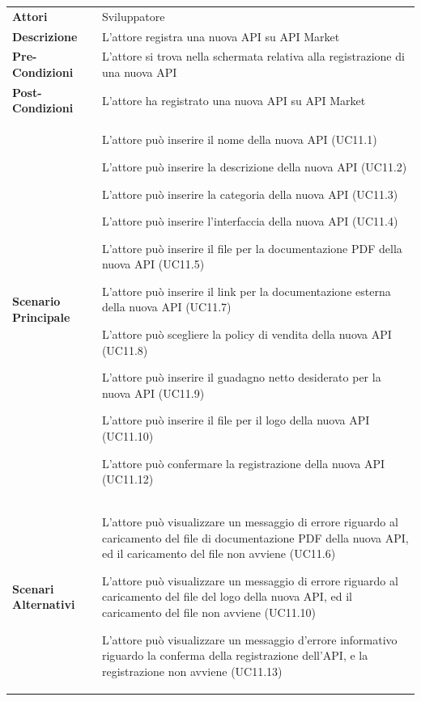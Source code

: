 \begin{longtable}{ l | p{11cm}}
	\hline
	\rowcolor{Gray}
	\multicolumn{2}{c}{UC11 - Registrazione nuova API}\\
	\hline
	\textbf{Attori} & Sviluppatore \\
	\textbf{Descrizione} & L'attore registra una nuova API su API Market \\
	\textbf{Pre-Condizioni} & L'attore si trova nella schermata relativa alla registrazione di una nuova API \\
	\textbf{Post-Condizioni} & L'attore ha registrato una nuova API su API Market \\
	\textbf{Scenario Principale} & 
	\begin{enumerate*}[label=(\arabic*.),itemjoin={\newline}]
		\item L'attore può inserire il nome della nuova API (UC11.1)
		\item L'attore può inserire la descrizione della nuova API (UC11.2)
		\item L'attore può inserire la categoria della nuova API (UC11.3)
		\item L'attore può inserire l'interfaccia della nuova API (UC11.4)
		\item L'attore può inserire il file per la documentazione PDF della nuova API (UC11.5)
		\item L'attore può inserire il link per la documentazione esterna della nuova API (UC11.7)
		\item L'attore può scegliere la policy di vendita della nuova API (UC11.8)
		\item L'attore può inserire il guadagno netto desiderato per la nuova API (UC11.9)
		\item L'attore può inserire il file per il logo della nuova API (UC11.10)
		\item L'attore può confermare la registrazione della nuova API (UC11.12)
	\end{enumerate*}\\
	\textbf{Scenari Alternativi} & 
	\begin{enumerate*}[label=(\arabic*.),itemjoin={\newline}]
			\item L'attore può visualizzare un messaggio di errore riguardo al caricamento del file di documentazione PDF della nuova API, ed il caricamento del file non avviene (UC11.6)
			\item L'attore può visualizzare un messaggio di errore riguardo al caricamento del file del logo della nuova API, ed il caricamento del file non avviene (UC11.10)
			\item L'attore può visualizzare un messaggio d'errore informativo riguardo la conferma della registrazione dell'API, e la registrazione non avviene (UC11.13)
	\end{enumerate*}\\
\end{longtable}

